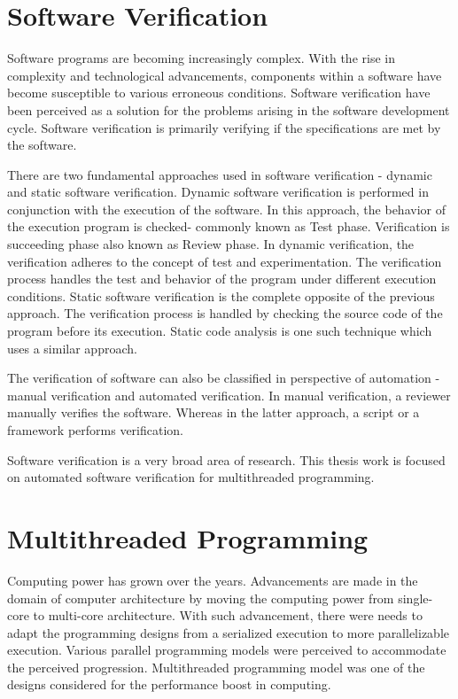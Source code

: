 \section{Software Verification}

Software programs are becoming increasingly complex. 
With the rise in complexity and technological advancements, components within a software have become susceptible to various erroneous conditions. 
Software verification have been perceived as a solution for the problems arising in the software development cycle. 
Software verification is primarily verifying if the specifications are met by the software\cite{ghezzi2002fundamentals}.

There are two fundamental approaches used in software verification - dynamic and static software verification\cite{ghezzi2002fundamentals}. 
Dynamic software verification is performed in conjunction with the execution of the software. 
In this approach, the behavior of the execution program is checked- commonly known as Test phase. 
Verification is succeeding phase also known as Review phase. 
In dynamic verification, the verification adheres to the concept of test and experimentation. 
The verification process handles the test and behavior of the program under different execution conditions. 
Static software verification is the complete opposite of the previous approach. 
The verification process is handled by checking the source code of the program before its execution. 
Static code analysis is one such technique which uses a similar approach. 

The verification of software can also be classified in perspective of automation - manual verification and automated verification. 
In manual verification, a reviewer manually verifies the software. 
Whereas in the latter approach, a script or a framework performs  verification. 

Software verification is a very broad area of research. 
This thesis work is focused on automated software verification for multithreaded programming. 

\section{Multithreaded Programming \label{multi_thread}}

Computing power has grown over the years. 
Advancements are made in the domain of computer architecture by moving the computing power from single-core to multi-core architecture. 
With such advancement, there were needs to adapt the programming designs from a serialized execution to more parallelizable execution. 
Various parallel programming models were perceived to accommodate the perceived progression. 
Multithreaded programming model was one of the designs considered for the performance boost in computing\cite{carver2005modern}. 

